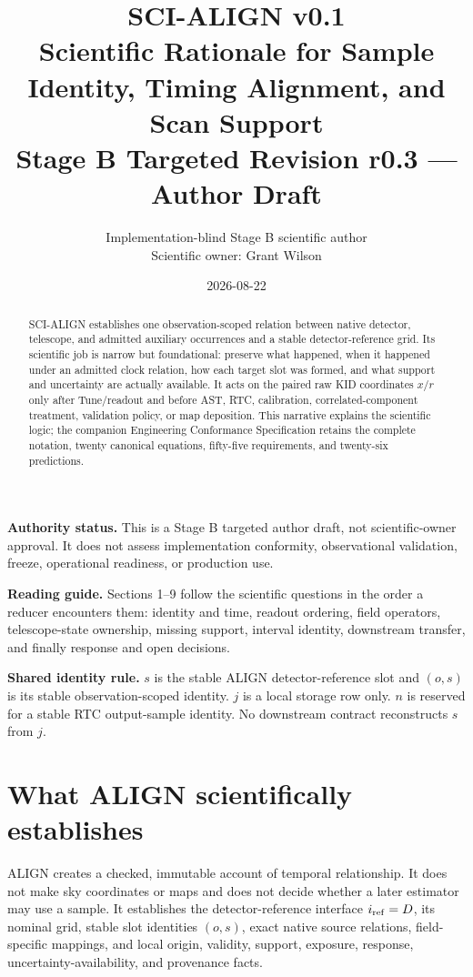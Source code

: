 \documentclass[10pt]{article}
\title{SCI-ALIGN v0.1\\
\large Scientific Rationale for Sample Identity, Timing Alignment, and Scan Support\\[0.3em]
\normalsize Stage B Targeted Revision r0.3 --- Author Draft}
\author{Implementation-blind Stage B scientific author\\
Scientific owner: Grant Wilson}
\date{2026-08-22}
\newcommand{\statusbox}[1]{\par\smallskip\noindent\colorbox{aligngray}{\parbox{0.96\linewidth}{#1}}\par\smallskip}
\begin{document}
\maketitle

\begin{abstract}
SCI-ALIGN establishes one observation-scoped relation between native detector,
telescope, and admitted auxiliary occurrences and a stable detector-reference
grid.  Its scientific job is narrow but foundational: preserve what happened,
when it happened under an admitted clock relation, how each target slot was
formed, and what support and uncertainty are actually available.  It acts on
the paired raw KID coordinates \(x/r\) only after Tune/readout and before AST,
RTC, calibration, correlated-component treatment, validation policy, or map
deposition.  This narrative explains the scientific logic; the companion
Engineering Conformance Specification retains the complete notation, twenty
canonical equations, fifty-five requirements, and twenty-six predictions.
\end{abstract}

\statusbox{\textbf{Authority status.} This is a Stage B targeted author draft,
not scientific-owner approval.  It does not assess implementation conformity,
observational validation, freeze, operational readiness, or production use.}

\noindent\textbf{Reading guide.} Sections 1--9 follow the scientific questions
in the order a reducer encounters them: identity and time, readout ordering,
field operators, telescope-state ownership, missing support, interval
identity, downstream transfer, and finally response and open decisions.

\vfill
\noindent\textbf{Shared identity rule.} \(s\) is the stable ALIGN
detector-reference slot and \((o,s)\) is its stable observation-scoped
identity.  \(j\) is a local storage row only.  \(n\) is reserved for a stable
RTC output-sample identity.  No downstream contract reconstructs \(s\) from
\(j\).

\clearpage
\section{What ALIGN scientifically establishes}

ALIGN creates a checked, immutable account of temporal relationship.  It does
not make sky coordinates or maps and does not decide whether a later estimator
may use a sample.  It establishes the detector-reference interface
\(i_{\rm ref}=D\), its nominal grid, stable slot identities \((o,s)\), exact
native source relations, field-specific mappings, and local origin, validity,
support, exposure, response, uncertainty-availability, and provenance facts.
\end{document}
